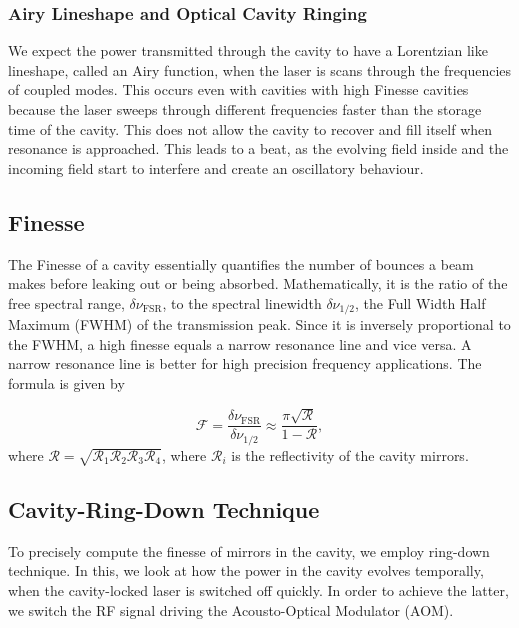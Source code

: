 \documentclass[a4paper]{report}
\numberwithin{equation}{section}
\begin{document}
\subsubsection{Airy Lineshape and Optical Cavity Ringing}
We expect the power transmitted through the cavity to have a Lorentzian like lineshape, called an Airy function, when the laser is scans through the frequencies of coupled modes. This occurs even with cavities with high Finesse cavities because the laser sweeps through different frequencies faster than the storage time of the cavity. This does not allow the cavity to recover and fill itself when resonance is approached. This leads to a beat, as the evolving field inside and the incoming field start to interfere and create an oscillatory behaviour. 

\subsection{Finesse} \label{sec:finesse}
The Finesse of a cavity essentially quantifies the number of bounces a beam makes before leaking out or being absorbed. Mathematically, it is the ratio of the free spectral range, $\delta \nu_{\mathrm{FSR}}$, to the spectral linewidth $\delta \nu_{1/2}$, the Full Width Half Maximum (FWHM) of the transmission peak. Since it is inversely proportional to the FWHM, a high finesse equals a narrow resonance line and vice versa. A narrow resonance line is better for high precision frequency applications. The formula is given by

\begin{equation} \label{eqn:finesse}
		\mathcal{F} = \frac{\delta \nu_{\mathrm{FSR}}}{\delta \nu_{1/2}} \approx \frac{\pi \sqrt{\mathcal{R}}}{1 - \mathcal{R}},
\end{equation}
where $\mathcal{R} = \sqrt{\mathcal{R}_{1} \mathcal{R}_{2} \mathcal{R}_{3} \mathcal{R}_{4}}$, where $\mathcal{R}_{i}$ is the reflectivity of the cavity mirrors. 

\subsection{Cavity-Ring-Down Technique} \label{sec:ring-down}
To precisely compute the finesse of mirrors in the cavity, we employ ring-down technique. In this, we look at how the power in the cavity evolves temporally, when the cavity-locked laser is switched off quickly. In order to achieve the latter, we switch the RF signal driving the Acousto-Optical Modulator (AOM). 
\end{document}
